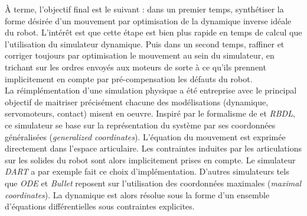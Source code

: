 À terme, l'objectif final est le suivant : dans un premier temps, 
synthétiser la forme désirée d'un mouvement par optimisation de la dynamique 
inverse idéale du robot. L'intérêt est que cette étape
est bien plus rapide en temps de calcul que l'utilisation du simulateur dynamique.
Puis dans un second temps, raffiner et corriger toujours par optimisation le mouvement
au sein du simulateur, en \og trichant \fg sur les ordres envoyés aux moteurs de sorte 
à ce qu'ils prennent implicitement en compte par pré-compensation les défauts du robot.\\

La réimplémentation d'une simulation physique a été entreprise
avec le principal objectif de maitriser précisément chacune
des modélisations (dynamique, servomoteurs, contact) misent en oeuvre.
Inspiré par le formalisme de \cite{featherstone_rigid_2008} et \textit{RBDL},
ce simulateur se base sur la représentation du système par ses 
coordonnées généralisées (\textit{generalized coordinates}).
L'équation du mouvement est exprimée directement dans l'espace articulaire.
Les contraintes induites par les articulations sur les solides du robot
sont alors implicitement prises en compte.
Le simulateur \textit{DART} a par exemple fait ce choix d'implémentation.
D'autres simulateurs tels que \textit{ODE} et \textit{Bullet}
reposent sur l'utilisation des coordonnées maximales (\textit{maximal coordinates}).
La dynamique est alors résolue sous la forme d'un ensemble d'équations
différentielles sous contraintes explicites.\\

